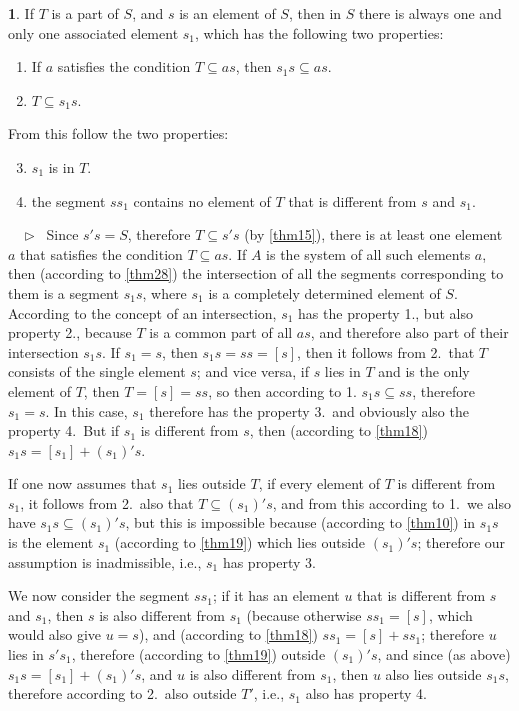 \documentclass[leqno,hidelinks]{article}
\theoremstyle{definition}
\newtheorem{satz}{\protect\satzname}
\newcommand{\satzname}{}
\renewcommand{\satzname}{\hspace{-4pt}.\ Satz}%
\renewcommand{\satzname}{\hspace{-4pt}.\ Theorem}%
\newcommand\beweis{ $ \phantom{'.'} \rhd \ $}%
\newcommand{\partof}{\subseteq}
\newcommand{\sref}[1]{\underline{\ref{#1}}}%
\begin{document}
\begin{paracol}{2}
\begin{satz}\label{thm29}
If $T$ is a part of $S$, and $s$ is an element of $S$, then in $S$ there is always
one and only one associated element $s_1$, which has the following two properties:
\begin{enumerate} \setcounter{enumi}{0} \setlength\itemsep{-0.25em}
  \item If $a$ satisfies the condition $T \partof as$, then $s_1s \partof as$.
  \item $T \partof s_1s$.
\end{enumerate}
From this follow the two properties:
\begin{enumerate} \setcounter{enumi}{2} \setlength\itemsep{-0.25em}
  \item $s_1$ is in $T$.
  \item the segment $ss_1$ contains no element of $T$ that is different from $s$ and $s_1$.
\end{enumerate}
\beweis
Since $s's = S$, therefore $T \partof s's$ (by \sref{thm15}), there is at least
one element $a$ that satisfies the condition $T \partof as$. If $A$ is the system
of all such elements $a$, then (according to \sref{thm28}) the intersection of
all the segments corresponding to them is a segment $s_1s$, where $s_1$ is a
completely determined element of $S$. According to the concept of an intersection,
$s_1$ has the property 1., but also property 2., because $T$ is a common part of
all $as$, and therefore also part of their intersection $s_1s$. If $s_1 = s$,
then $s_1s = ss = [s]$, then it follows from 2.\ that $T$ consists of the single
element $s$; and vice versa, if $s$ lies in $T$ and is the only element of $T$,
then $T = [s] = ss$, so then according to 1. $s_1s \partof ss$, therefore $s_1 = s$.
In this case, $s_1$ therefore has the property 3.\ and obviously also the property
4.\ But if $s_1$ is different from $s$, then (according to \sref{thm18})
$s_1s = [s_1] + (s_1)'s$.

If one now assumes that $s_1$ lies outside $T$, if every element of $T$ is
different from $s_1$, it follows from 2.\ also that $T \partof (s_1)'s$, and from
this according to 1.\ we also have $s_1s \partof (s_1)'s$, but this is impossible
because (according to \sref{thm10}) in $s_1s$ is the element $s_1$ (according to
\sref{thm19}) which lies outside $(s_1)'s$; therefore our assumption is inadmissible,
i.e., $s_1$ has property 3.

We now consider the segment $ss_1$; if it has an element $u$ that is different
from $s$ and $s_1$, then $s$ is also different from $s_1$ (because otherwise
$ss_1 = [s]$, which would also give $u=s$), and (according to \sref{thm18})
$ss_1 = [s] + ss_1$; therefore $u$ lies in $s's_1$, therefore (according to
\sref{thm19}) outside $(s_1)'s$, and since (as above) $s_1s= [s_1] + (s_1)'s$,
and $u$ is also different from $s_1$, then $u$ also lies outside $s_1s$, therefore
according to 2.\ also outside $T'$, i.e., $s_1$ also has property 4.
\end{satz}


\end{paracol}
\end{document}
